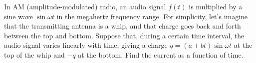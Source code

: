         In AM (amplitude-modulated) radio, an audio signal
        $f(t)$ is multiplied by a sine wave $\sin \omega t$
        in the megahertz frequency range. For simplicity, let's
        imagine that the transmitting antenna is a whip, and that
        charge goes back and forth between the top and bottom.
        Suppose that, during a certain time interval,
        the audio signal varies linearly with time, giving
        a charge $q=(a+bt)\sin \omega t$ at the top of the whip and $-q$ at
        the bottom. Find the current as a function of time. 
        \answercheck
